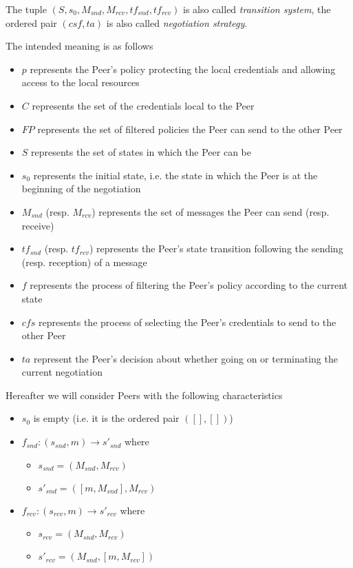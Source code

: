\documentclass{article}
\begin{document}
The tuple $(S, s_{0}, M_{snd}, M_{rcv}, tf_{snd}, tf_{rcv})$ is also called \textit{transition system}, the ordered pair $(csf, ta)$ is also called \textit{negotiation strategy}.

The intended meaning is as follows

\begin{itemize}
	\item $p$ represents the Peer's policy protecting the local credentials and allowing access to the local resources
	\item $C$ represents the set of the credentials local to the Peer
	\item $FP$ represents the set of filtered policies the Peer can send to the other Peer
	\item $S$ represents the set of states in which the Peer can be
	\item $s_{0}$ represents the initial state, i.e. the state in which the Peer is at the beginning of the negotiation
	\item $M_{snd}$ (resp. $M_{rcv}$) represents the set of messages the Peer can send (resp. receive)
	\item $tf_{snd}$ (resp. $tf_{rcv}$) represents the Peer's state transition following the sending (resp. reception) of a message
	\item $f$ represents the process of filtering the Peer's policy according to the current state
	\item $cfs$ represents the process of selecting the Peer's credentials to send to the other Peer
	\item $ta$ represent the Peer's decision about whether going on or terminating the current negotiation
\end{itemize}

Hereafter we will consider Peers with the following characteristics

\begin{itemize}
\item $s_{0}$ is empty (i.e. it is the ordered pair $([], [])$)
\item $f_{snd}:(s_{snd}, m) \rightarrow s'_{snd}$ where
  \begin{itemize}
	\item $s_{snd} = (M_{snd}, M_{rcv})$
	\item $s'_{snd} = ([m, M_{snd}], M_{rcv})$
  \end{itemize}
\item $f_{rcv}:(s_{rcv}, m) \rightarrow s'_{rcv}$ where
  \begin{itemize}
	\item $s_{rcv} = (M_{snd}, M_{rcv})$
	\item $s'_{rcv} = (M_{snd}, [m, M_{rcv}])$
  \end{itemize}
\end{itemize}
\end{document}
